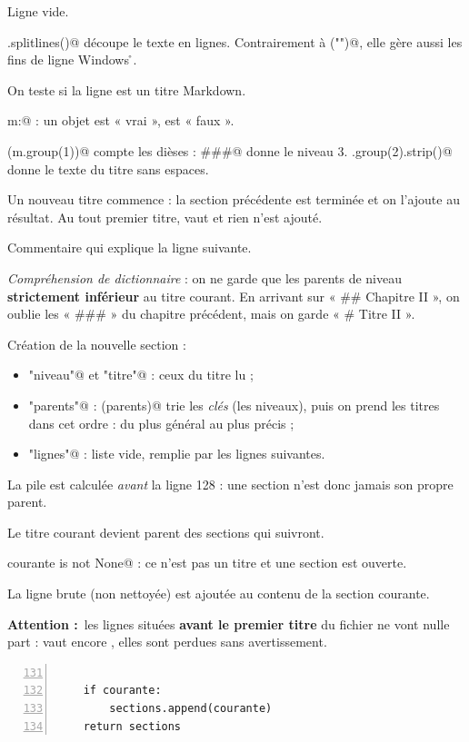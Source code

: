 \documentclass[11pt,a4paper]{article}
\newcommand{\ligne}[1]{\item[\textcolor{num}{L.\,#1}]}
\newenvironment{explication}
  {\begin{description}\setlength{\itemsep}{3pt}\setlength{\parskip}{2pt}}
  {\end{description}}
\newcommand{\attention}{\par\textcolor{alerte}{\textbf{Attention :}}\ }
\begin{document}
\begin{explication}
\ligne{114} Ligne vide.
\ligne{115} \Verb@texte.splitlines()@ découpe le texte en lignes. Contrairement à
\Verb@split("\n")@, elle gère aussi les fins de ligne Windows \Verb@\r\n@.
\ligne{116} On teste si la ligne est un titre Markdown.
\ligne{117} \Verb@if m:@ : un objet \Verb@Match@ est « vrai », \Verb@None@ est « faux ».
\ligne{118} \Verb@len(m.group(1))@ compte les dièses : \Verb@###@ donne le niveau 3.
\Verb@m.group(2).strip()@ donne le texte du titre sans espaces.
\ligne{119--120} Un nouveau titre commence : la section précédente est terminée et on l'ajoute au
résultat. Au tout premier titre, \Verb@courante@ vaut \Verb@None@ et rien n'est ajouté.
\ligne{121--123} Commentaire qui explique la ligne suivante.
\ligne{124} \emph{Compréhension de dictionnaire} : on ne garde que les parents de niveau
\textbf{strictement inférieur} au titre courant. En arrivant sur « \#\# Chapitre II », on
oublie les « \#\#\# » du chapitre précédent, mais on garde « \# Titre II ».
\ligne{125--127} Création de la nouvelle section :
  \begin{itemize}
    \item \Verb@"niveau"@ et \Verb@"titre"@ : ceux du titre lu ;
    \item \Verb@"parents"@ : \Verb@sorted(parents)@ trie les \emph{clés} (les niveaux), puis on
          prend les titres dans cet ordre : du plus général au plus précis ;
    \item \Verb@"lignes"@ : liste vide, remplie par les lignes suivantes.
  \end{itemize}
  La pile est calculée \emph{avant} la ligne 128 : une section n'est donc jamais son propre parent.
\ligne{128} Le titre courant devient parent des sections qui suivront.
\ligne{129} \Verb@elif courante is not None@ : ce n'est pas un titre et une section est ouverte.
\ligne{130} La ligne brute (non nettoyée) est ajoutée au contenu de la section courante.
\end{explication}
\attention les lignes situées \textbf{avant le premier titre} du fichier ne vont nulle part :
\Verb@courante@ vaut encore \Verb@None@, elles sont perdues sans avertissement.\par

\begin{shaded}
\begin{Verbatim}[numbers=left,firstnumber=131,numbersep=6pt,fontsize=\footnotesize,xleftmargin=1.2em]

    if courante:
        sections.append(courante)
    return sections
\end{Verbatim}
\end{shaded}
\end{document}
